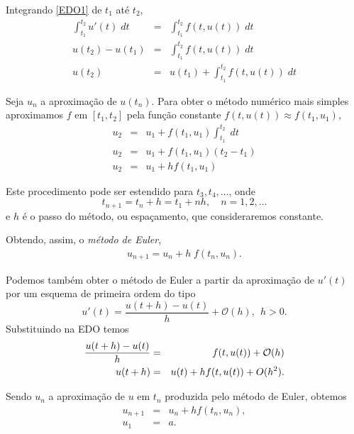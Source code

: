 Integrando \eqref{EDO1} de $t_1$ até $t_2$,
\begin{eqnarray}
  \int_{t_1}^{t_2} u'(t) \;dt &=& \int_{t_1}^{t_2} f(t,u(t)) \; dt\\
  u(t_2)-u(t_1)               &=& \int_{t_1}^{t_2} f(t,u(t)) \; dt\\
  u(t_2)                      &=& u(t_1) +  \int _{t_1}^{t_2} f(t,u(t)) \; dt
\end{eqnarray}

Seja $u_n$ a aproximação de $u(t_n)$. Para obter o método numérico mais simples aproximamos $f$ em $[t_1,t_2]$ pela função constante $f(t,u(t)) \approx  f(t_1,u_1)$,
\begin{eqnarray}
  u_2 &=&  u_1 +   f(t_1,u_1) \int _{t_1}^{t_2}  \; dt \\
  u_2 &=&  u_1 +   f(t_1,u_1) (t_2-t_1) \\
  u_2 &=&  u_1 + h f(t_1,u_1)
\end{eqnarray}

Este procedimento pode ser estendido para $t_3,t_4,\ldots $, onde
$$ t_{n+1}=t_n + h=t_1+n h, \quad  n=1,2,\ldots $$
e $h$ é o passo do método, ou espaçamento, que consideraremos constante.

Obtendo, assim, o \emph{método de Euler},
\begin{eqnarray}\label{euler}
u_{n+1}=u_n + h\;f(t_n,u_n).
\end{eqnarray}


Podemos também  obter o método de Euler a partir da aproximação de $u'(t)$ por um esquema de primeira ordem do tipo
$$u'(t)=\frac{u(t+h)-u(t)}{h}+\mathcal{O}(h),~~ h>0.$$
Substituindo na EDO temos
\begin{eqnarray}
\frac{u(t+h)-u(t)}{h}&=&f(t,u(t))+\mathcal{O}(h)\\
u(t+h)&=&u(t)+hf(t,u(t))+O(h^2).{\label{erro_local}}
\end{eqnarray}

Sendo $u_n$ a aproximação de $u$ em $t_n$ produzida pelo método de Euler, obtemos
\begin{eqnarray}\label{PVI_EULER}
u_{n+1}&=&u_n+hf(t_n,u_n),\\
u_1    &=&a.
\end{eqnarray}




